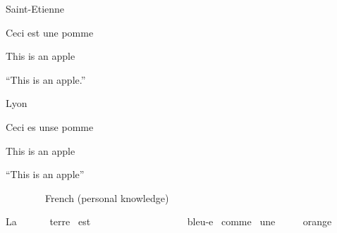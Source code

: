 \begin{listLangSciLanginfoiileveli}
\item 
\setcounter{listLangSciLanginfoiilevelii}{0}
\begin{listLangSciLanginfoiilevelii}
\item 
\begin{styleLangSciLanginfo}
Saint-Etienne
\end{styleLangSciLanginfo}
\end{listLangSciLanginfoiilevelii}
\end{listLangSciLanginfoiileveli}
\begin{styleLangSciExample}
Ceci est une pomme
\end{styleLangSciExample}

\begin{styleLangSciIMT}
This is an apple
\end{styleLangSciIMT}

\begin{styleLangSciTranslationSubexample}
“This is an apple.”
\end{styleLangSciTranslationSubexample}

\begin{listLangSciLanginfoiileveli}
\item 
\setcounter{listLangSciLanginfoiilevelii}{0}
\begin{listLangSciLanginfoiilevelii}
\item 
\begin{styleLangSciLanginfo}
Lyon
\end{styleLangSciLanginfo}
\end{listLangSciLanginfoiilevelii}
\end{listLangSciLanginfoiileveli}
\begin{styleLangSciExample}
Ceci es unse pomme
\end{styleLangSciExample}

\begin{styleLangSciIMT}
This is an apple
\end{styleLangSciIMT}

\begin{styleLangSciTranslationSubexample}
“This is an apple”
\end{styleLangSciTranslationSubexample}


\begin{listLangSciLanginfoiileveli}
\item 
\begin{styleLangSciLanginfo}
\ \ \ \ \ \ \ \ French (personal knowledge) \ \ 
\end{styleLangSciLanginfo}

\end{listLangSciLanginfoiileveli}
\begin{styleLangSciExample}
La \ \ \ \ \ \ terre \ est \ \ \ \ \ \ \ \ \ \ \ \ \ \ \ \ \ \ \ bleu-e \ comme \ une \ \ \ \ \ orange
\end{styleLangSciExample}


